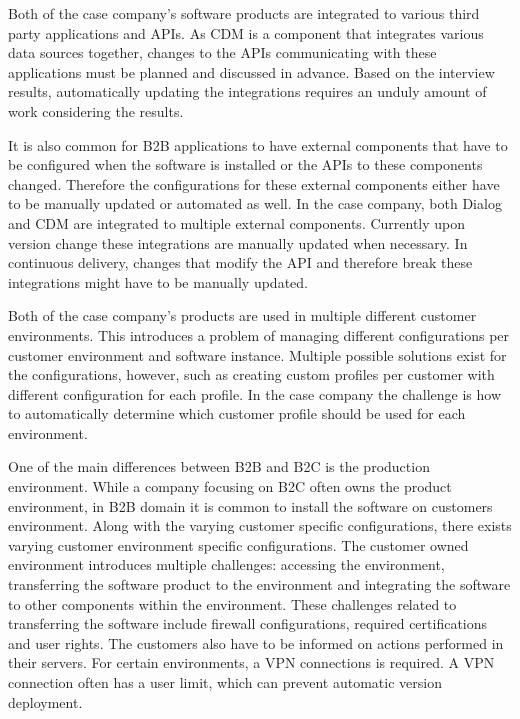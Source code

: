 \documentclass[english]{tktltiki2}
\theoremstyle{definition}
\theoremstyle{remark}
\begin{document}
Both of the case company's software products are integrated to various third party applications and APIs. As CDM is a component that integrates various data sources together, changes to the APIs communicating with these applications must be planned and discussed in advance. Based on the interview results, automatically updating the integrations requires an unduly amount of work considering the results. 

It is also common for B2B applications to have external components that have to be configured when the software is installed or the APIs to these components changed. Therefore the configurations for these external components either have to be manually updated or automated as well. In the case company, both Dialog and CDM are integrated to multiple external components. Currently upon version change these integrations are manually updated when necessary. In continuous delivery, changes that modify the API and therefore break these integrations might have to be manually updated.

Both of the case company's products are used in multiple different customer environments. This introduces a problem of managing different configurations per customer environment and software instance. Multiple possible solutions exist for the configurations, however, such as creating custom profiles per customer with different configuration for each profile. In the case company the challenge is how to automatically determine which customer profile should be used for each environment.

One of the main differences between B2B and B2C is the production environment. While a company focusing on B2C often owns the product environment, in B2B domain it is common to install the software on customers environment. Along with the varying customer specific configurations, there exists varying customer environment specific configurations. The customer owned environment introduces multiple challenges: accessing the environment, transferring the software product to the environment and integrating the software to other components within the environment. These challenges related to transferring the software include firewall configurations, required certifications and user rights. The customers also have to be informed on actions performed in their servers. For certain environments, a VPN connections is required. A VPN connection often has a user limit, which can prevent automatic version deployment.
\end{document}
